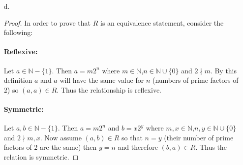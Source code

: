 \documentclass[11pt]{amsart}
\theoremstyle{definition}
\begin{document}
\begin{itemize}
\begin{itemize}
\begin{proof}
        \paragraph{Symmetric:}
            Let $x,y\in\mathbb{R}$. Now assume that $(x,y)\in V$ so that $x=y$ or $xy=1$. Since $y=x$ and $yx=1$ is true by assumptions then $(y,x)\in V$ so that $V$ is symmetric.
        \paragraph{Transitive:}
            Let $x,y,z\in\mathbb{R}$. Now assume that $(x,y)\in V$ and $(y,z)\in V$ so that $x=y$ or $xy=1$ and $y=z$ or $yz=1$. In the case that $y=z$ simply by substitution $x=z$ or $xz=1$. In the case that $yz=1$ if $x=y$ then $xz=1$ and if $xy=1$ then $x=z$. Thus $(x,z)\in V$ so that $V$ is transitive. \\
        Thus we've shown that $V$ is an equivalence relation as it is reflexive, symmetric, and transitive.
    \end{proof}
    $\bar 3=\{3,\frac13\}$ \\
    $-\bar {\frac23}=\{-\frac23,-\frac32\}$ \\
    $\bar 0=\{0\}$

    \item[d.]
    \begin{proof}
        In order to prove that $R$ is an equivalence statement, consider the following:
        \paragraph{Reflexive:}
            Let $a\in\mathbb{N}-\{1\}$. Then $a=m2^n$ where $m\in\mathbb{N}$,$n\in\mathbb{N}\cup\{0\}$ and $2\nmid m$. By this definition $a$ and $a$ will have the same value for $n$ (numbers of prime factors of $2$) so $(a,a)\in R$. Thus the relationship is reflexive.
        \paragraph{Symmetric:}
            Let $a,b\in\mathbb{N}-\{1\}$. Then $a=m2^n$ and $b=x2^y$ where $m,x\in\mathbb{N}$,$n,y\in\mathbb{N}\cup\{0\}$ and $2\nmid m,x$. Now assume $(a,b)\in R$ so that $n=y$ (their number of prime factors of $2$ are the same) then $y=n$ and therefore $(b,a)\in R$. Thus the relation is symmetric.

\end{proof}
\end{itemize}
\end{itemize}
\end{document}
